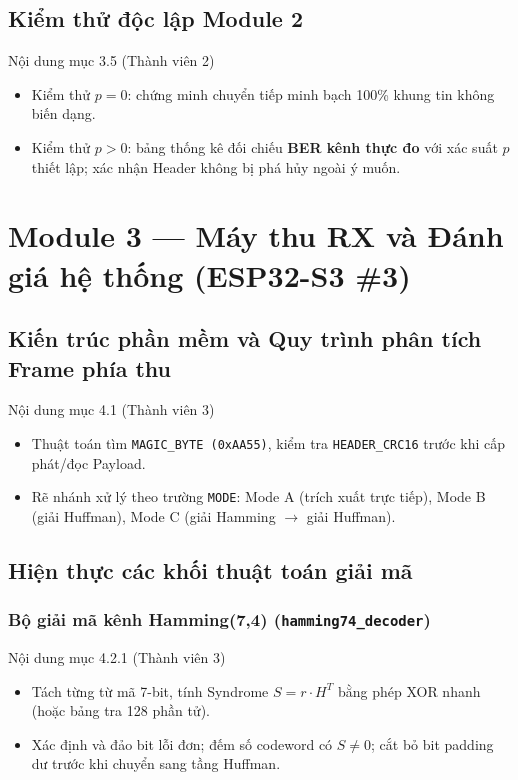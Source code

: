 \documentclass[12pt,a4paper]{report}
\begin{document}
\section{Kiểm thử độc lập Module 2}
\begin{notebox}{Nội dung mục 3.5 (Thành viên 2)}
\begin{itemize}[leftmargin=*,nosep]
    \item Kiểm thử $p = 0$: chứng minh chuyển tiếp minh bạch 100\% khung tin không biến dạng.
    \item Kiểm thử $p > 0$: bảng thống kê đối chiếu \textbf{BER kênh thực đo} với xác suất $p$ thiết lập; xác nhận Header không bị phá hủy ngoài ý muốn.
\end{itemize}
\end{notebox}

\chapter{Module 3 --- Máy thu RX và Đánh giá hệ thống (ESP32-S3 \#3)}

\section{Kiến trúc phần mềm và Quy trình phân tích Frame phía thu}
\begin{notebox}{Nội dung mục 4.1 (Thành viên 3)}
\begin{itemize}[leftmargin=*,nosep]
    \item Thuật toán tìm \texttt{MAGIC\_BYTE (0xAA55)}, kiểm tra \texttt{HEADER\_CRC16} trước khi cấp phát/đọc Payload.
    \item Rẽ nhánh xử lý theo trường \texttt{MODE}: Mode A (trích xuất trực tiếp), Mode B (giải Huffman), Mode C (giải Hamming $\rightarrow$ giải Huffman).
\end{itemize}
\end{notebox}

\section{Hiện thực các khối thuật toán giải mã}
\subsection{Bộ giải mã kênh Hamming(7,4) (\texttt{hamming74\_decoder})}
\begin{notebox}{Nội dung mục 4.2.1 (Thành viên 3)}
\begin{itemize}[leftmargin=*,nosep]
    \item Tách từng từ mã 7-bit, tính Syndrome $S = r \cdot H^T$ bằng phép XOR nhanh (hoặc bảng tra 128 phần tử).
    \item Xác định và đảo bit lỗi đơn; đếm số codeword có $S \ne 0$; cắt bỏ bit padding dư trước khi chuyển sang tầng Huffman.
\end{itemize}
\end{notebox}
\end{document}
